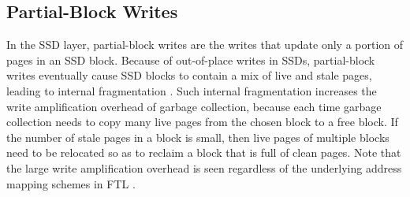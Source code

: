 
\subsection{Partial-Block Writes}

In the SSD layer, partial-block writes are the writes that update only a
portion of pages in an SSD block.  Because of out-of-place writes in SSDs, 
partial-block writes eventually cause SSD blocks to
contain a mix of live and stale pages, leading to internal fragmentation
\cite{chen09}.  Such internal fragmentation increases the write amplification
overhead of garbage collection, because each time garbage collection needs to
copy many live pages from the chosen block to a free block. If the number of
stale pages in a block is small, then live pages of multiple blocks need to be
relocated so as to reclaim a block that is full of clean pages. Note that the
large write amplification overhead is seen regardless of the underlying
address mapping schemes in FTL \cite{min12}. 






